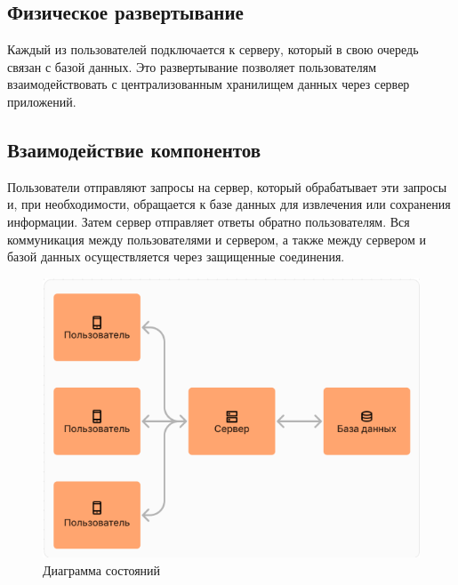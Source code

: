 \documentclass[a4paper,12pt]{article}
\begin{document}
\subsection{Физическое развертывание}
Каждый из пользователей подключается к серверу, который в свою очередь связан с базой данных. Это развертывание позволяет пользователям взаимодействовать с централизованным хранилищем данных через сервер приложений.

\subsection{Взаимодействие компонентов}
Пользователи отправляют запросы на сервер, который обрабатывает эти запросы и, при необходимости, обращается к базе данных для извлечения или сохранения информации. Затем сервер отправляет ответы обратно пользователям. Вся коммуникация между пользователями и сервером, а также между сервером и базой данных осуществляется через защищенные соединения.

\begin{figure}[-h]
    \centering
    \includegraphics[width=0.5\linewidth]{17UML.png}
    \caption{Диаграмма состояний}
\end{figure}
\end{document}
